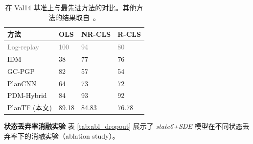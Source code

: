 \documentclass[letterpaper, 10 pt, conference]{ieeeconf}  %
\newcommand{\fadedtext}[1]{\textcolor{gray}{#1}}
\renewcommand{\paragraph}[1]{\vspace{1.25mm}\noindent\textbf{#1}}
\begin{document}
\begin{table}[h]
\vspace{6pt}
\begin{center}
\setlength{\tabcolsep}{7pt}
\renewcommand{\arraystretch}{1.2}
\small
\begin{tabular}{y{70}|x{30}x{35}x{30}}
\toprule
方法       & OLS & NR-CLS & R-CLS \\ \midrule
\fadedtext{Log-replay}   & \fadedtext{100} & \fadedtext{94}     & \fadedtext{80}    \\
IDM~\cite{treiber2000idm}          & 38  & 77     & 76    \\
GC-PGP~\cite{hallgarten2023gc-pgp}       & 82  & 57     & 54    \\
PlanCNN~\cite{caesar2021nuplan}      & 64  & 73     & 72    \\
PDM-Hybrid~\cite{Dauner2023CORL}   & 84  & 93     & 92    \\ \midrule
PlanTF (本文) & 89.18    & 84.83  & 76.78 \\ \bottomrule
\end{tabular}
\end{center}
\vspace{0.5em}
\caption{在 Val14 基准上与最先进方法的对比。其他方法的结果取自~\cite{Dauner2023CORL}。}
\label{tab:val14}
\end{table}

\paragraph{状态丢弃率消融实验} 表 \ref{tab:abl_dropout} 展示了 \textit{state6+SDE} 模型在不同状态丢弃率下的消融实验（ablation study）。
\end{document}
